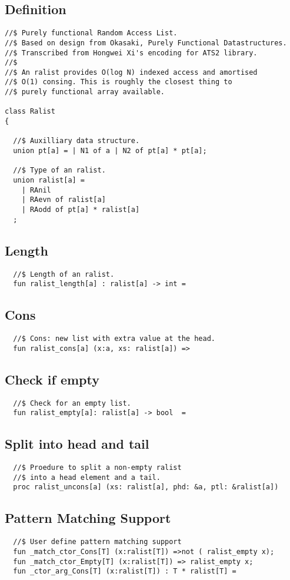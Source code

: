 \documentclass[oneside]{book}
\begin{document}
{\subsection{Definition}
\begin{verbatim}
//$ Purely functional Random Access List.
//$ Based on design from Okasaki, Purely Functional Datastructures.
//$ Transcribed from Hongwei Xi's encoding for ATS2 library.
//$
//$ An ralist provides O(log N) indexed access and amortised
//$ O(1) consing. This is roughly the closest thing to
//$ purely functional array available.

class Ralist
{

  //$ Auxilliary data structure.
  union pt[a] = | N1 of a | N2 of pt[a] * pt[a];

  //$ Type of an ralist.
  union ralist[a] = 
    | RAnil
    | RAevn of ralist[a]
    | RAodd of pt[a] * ralist[a]
  ;
\end{verbatim}
\subsection{Length}
\begin{verbatim}
  //$ Length of an ralist.
  fun ralist_length[a] : ralist[a] -> int =
\end{verbatim}
\subsection{Cons}
\begin{verbatim}
  //$ Cons: new list with extra value at the head.
  fun ralist_cons[a] (x:a, xs: ralist[a]) =>
\end{verbatim}
\subsection{Check if empty}
\begin{verbatim}
  //$ Check for an empty list.
  fun ralist_empty[a]: ralist[a] -> bool  =
\end{verbatim}
\subsection{Split into head and tail}
\begin{verbatim}
  //$ Proedure to split a non-empty ralist
  //$ into a head element and a tail.
  proc ralist_uncons[a] (xs: ralist[a], phd: &a, ptl: &ralist[a])
\end{verbatim}
\subsection{Pattern Matching Support}
\begin{verbatim}
  //$ User define pattern matching support
  fun _match_ctor_Cons[T] (x:ralist[T]) =>not ( ralist_empty x);
  fun _match_ctor_Empty[T] (x:ralist[T]) => ralist_empty x;
  fun _ctor_arg_Cons[T] (x:ralist[T]) : T * ralist[T] =
\end{verbatim}
}
\end{document}
